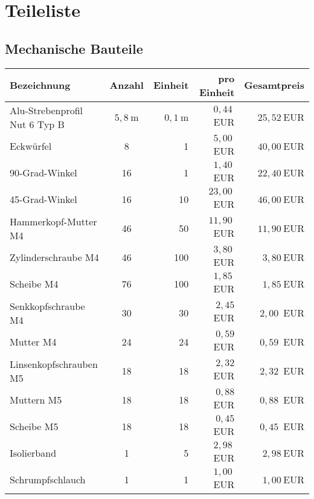 \documentclass[./00PhotoBox.tex]{subfiles}
\begin{document}
\chapter{Teileliste}
\label{ch:teileliste}
\section{Mechanische Bauteile}


\begin{table}[ht]
    \centering
    \begin{tabular}{l|c|r|r|r}
        Bezeichnung                   & Anzahl  & Einheit & pro Einheit & Gesamtpreis           \\
        \hline
        Alu-Strebenprofil Nut 6 Typ B & $5,8~$m & $0,1~$m & $0,44~$EUR  & $25,52~$EUR           \\
        Eckwürfel                     & 8       & 1       & $5,00~$EUR  & $40,00~$EUR           \\
        90-Grad-Winkel                & 16      & 1       & $1,40~$EUR  & $22,40~$EUR           \\
        45-Grad-Winkel                & 16      & 10      & $23,00~$EUR & $46,00~$EUR           \\
        Hammerkopf-Mutter M4          & 46      & 50      & $11,90~$EUR & $11,90~$EUR           \\
        Zylinderschraube M4           & 46      & 100     & $3,80~$EUR  & $3,80~$EUR            \\
        Scheibe M4                    & 76      & 100     & $1,85~$EUR  & $1,85~$EUR            \\
        Senkkopfschraube M4           & 30      & 30      & $2,45$~EUR  & $2,00$~EUR            \\
        Mutter M4                     & 24      & 24      & $0,59$~EUR  & $0,59$~EUR            \\
        Linsenkopfschrauben M5        & 18      & 18      & $2,32$~EUR  & $2,32$~EUR            \\ %
        Muttern M5                    & 18      & 18      & $0,88$~EUR  & $0,88$~EUR            \\
        Scheibe M5                    & 18      & 18      & $0,45$~EUR  & $0,45$~EUR            \\
        Isolierband                   & 1       & 5       & $2,98~$EUR  & $2,98~$EUR            \\
        Schrumpfschlauch              & 1       & 1       & $1,00~$EUR  & $1,00~$EUR            \\

\end{tabular}
\end{table}
\end{document}
